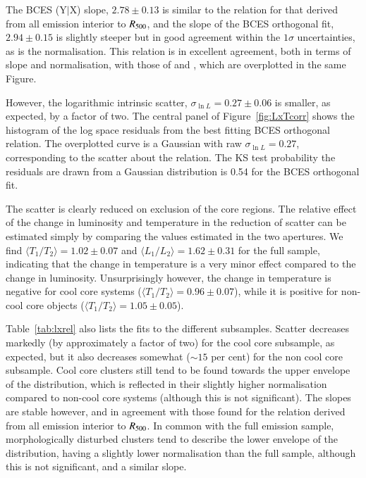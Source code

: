 \documentclass[oldversion]{aa}
\begin{document}
{The BCES (Y$|$X) slope, $2.78\pm0.13$ is
similar to the relation for that derived from all emission interior to
$R_{500}$, and the slope of the BCES orthogonal fit, $2.94\pm0.15$ is slightly steeper but in good agreement within the $1\sigma$ uncertainties, as is the normalisation. This relation is in excellent agreement, both in terms of slope and normalisation, with those of \citet{mark98} and \citet{ae99}, which are overplotted in the same Figure. 

However, the logarithmic intrinsic scatter, $\sigma_{\ln{L}} = 0.27\pm0.06$ is smaller, as expected, by a factor of two. The
central panel of Figure~\ref{fig:LxTcorr} shows the histogram of
the log space residuals from the best fitting BCES orthogonal relation. The
overplotted curve is a Gaussian with raw $\sigma_{\ln{L}} =
0.27$, corresponding to the scatter about the relation. The KS test probability the residuals are drawn from a Gaussian distribution is 0.54 for the BCES orthogonal fit.

The scatter is clearly reduced on exclusion of the core regions. The relative effect of the change in luminosity and temperature in the reduction of scatter can be estimated simply by comparing the values estimated in the two apertures. We find $\langle T_1/T_2 \rangle = 1.02\pm0.07$ and $\langle L_1/L_2 \rangle =1.62\pm0.31$ for the full sample, indicating that the change in temperature is a very minor effect compared to the  change in luminosity. Unsurprisingly however, the change in temperature is negative for cool core systems ($\langle T_1/T_2 \rangle = 0.96\pm0.07$), while it is positive for non-cool core objects ($\langle T_1/T_2 \rangle = 1.05\pm0.05$).

Table~\ref{tab:lxrel} also lists the fits to the different
subsamples. Scatter decreases markedly (by approximately a factor of two) for the cool core subsample, as expected, but it also decreases somewhat ($\sim 15$ per cent) for the non cool core subsample.  Cool core clusters still tend to be found towards the upper envelope of the distribution, which is reflected in their
slightly higher normalisation compared to non-cool
core systems (although this is not significant). The slopes are stable however, and in agreement with
those found for the relation derived from all emission interior to
$R_{500}$. In common with the full emission sample, morphologically
disturbed clusters tend to describe the lower envelope of the
distribution, having a slightly lower normalisation than the full sample, although this is not significant, and a similar slope.

}
\end{document}
